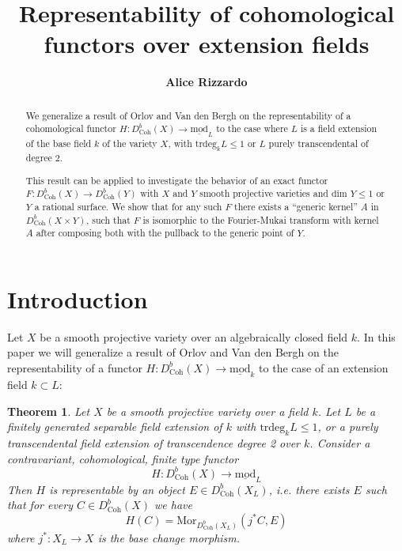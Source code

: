 \documentclass{amsart}
\begin{document}
\newtheorem{theorem}{Theorem}[section]
\newtheorem{lemma}[theorem]{Lemma}
\newtheorem{definition}[theorem]{Definition}
\newtheorem{proposition}[theorem]{Proposition}
\newtheorem{corollary}[theorem]{Corollary}
\newtheorem{remark}[theorem]{Remark}

\title{Representability of cohomological functors over extension fields}
\author{\bf{Alice Rizzardo} }
\maketitle

\begin{abstract}
We generalize a result of Orlov and Van den Bergh on the representability of a cohomological functor  $H:D^{b}_{\mathrm{Coh}}(X)\to \underline{\mathrm{mod}}_{L}$ to the case where $L$ is a field extension of the base field $k$ of the variety $X$, with $\text{trdeg}_k L\leq 1$ or $L$ purely transcendental of degree 2.

This result can be applied to investigate the behavior of an exact functor $F:D^{b}_{\mathrm{Coh}}(X)\to D^{b}_{\mathrm{Coh}}(Y)$ with $X$ and $Y$ smooth projective varieties and $\text{dim } Y\leq 1$ or $Y$ a rational surface. We show that for any such $F$ there exists a ``generic kernel'' $A$ in $D^{b}_{\mathrm{Coh}}(X\times Y)$, such that $F$ is isomorphic to the Fourier-Mukai transform with kernel $A$ after composing both with the pullback to the generic point of $Y$.
\end{abstract}

\section{Introduction}
Let $X$ be a smooth projective variety over an algebraically closed field $k$.  In this paper we will generalize a result of Orlov and Van den Bergh  \cite[Lemma 2.14]{failure} on the representability of a functor $H:D^{b}_{\mathrm{Coh}}(X)\to \underline{\mathrm{mod}}_{k}$ to the case of an extension field $k \subset L$:
\begin{theorem}\label{ebounded}
Let $X$ be a smooth projective variety over a field $k$. Let $L$ be a finitely generated separable field extension of $k$ with $\text{trdeg}_{k}L\leq 1$, or a purely transcendental field extension of transcendence degree 2 over $k$. Consider a contravariant, cohomological, finite type functor
$$H:D^{b}_{\mathrm{Coh}}(X){\rightarrow} \underline{\mathrm{mod}}_{L}$$
Then $H$ is representable by an object $E\in D^{b}_{\mathrm{Coh}}(X_{L})$, i.e. there exists $E$ such that for every $C\in D^{b}_{\mathrm{Coh}}(X)$ we have
$$H(C)=\mathrm{Mor}_{D^{b}_{\mathrm{Coh}}(X_{L})}(j^{*}C,E)$$
where $j^{*}:X_{L}\to X$ is the base change morphism.
\end{theorem}
\end{document}
